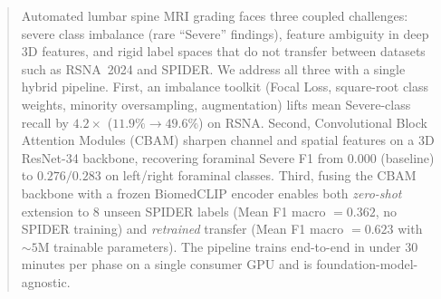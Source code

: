 \begin{abstract}
Automated lumbar spine MRI grading faces three coupled challenges:
severe class imbalance (rare ``Severe'' findings), feature ambiguity
in deep 3D features, and rigid label spaces that do not transfer
between datasets such as RSNA~2024 and SPIDER. We address all three
with a single hybrid pipeline. First, an imbalance toolkit (Focal
Loss, square-root class weights, minority oversampling, augmentation)
lifts mean Severe-class recall by $4.2\times$ ($11.9\% \to 49.6\%$)
on RSNA. Second, Convolutional Block Attention Modules (CBAM) sharpen
channel and spatial features on a 3D ResNet-34 backbone, recovering
foraminal Severe F1 from $0.000$ (baseline) to $0.276/0.283$ on
left/right foraminal classes. Third, fusing the CBAM backbone with a
frozen BiomedCLIP encoder enables both \emph{zero-shot} extension to
$8$ unseen SPIDER labels (Mean F1 macro $= 0.362$, no SPIDER training)
and \emph{retrained} transfer (Mean F1 macro $= 0.623$ with
${\sim}5$M trainable parameters). The pipeline trains end-to-end in
under $30$ minutes per phase on a single consumer GPU and is
foundation-model-agnostic.
\end{abstract}
